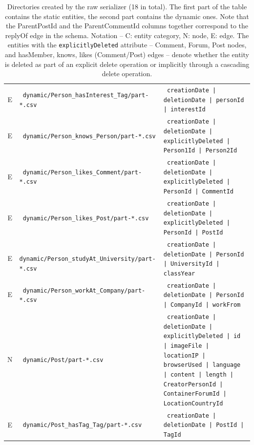 \begin{table}[htb]
\begin{tabularx}{\linewidth}{|>{\sffamily}c|>{\tt}l|>{\tt}X|}
        E                    & dynamic/Person\_hasInterest\_Tag/part-*.csv      & creationDate | deletionDate | personId | interestId \\
        E                    & dynamic/Person\_knows\_Person/part-*.csv         & creationDate | deletionDate | explicitlyDeleted | Person1Id | Person2Id \\
        E                    & dynamic/Person\_likes\_Comment/part-*.csv        & creationDate | deletionDate | explicitlyDeleted | PersonId | CommentId \\
        E                    & dynamic/Person\_likes\_Post/part-*.csv           & creationDate | deletionDate | explicitlyDeleted | PersonId | PostId \\
        E                    & dynamic/Person\_studyAt\_University/part-*.csv   & creationDate | deletionDate | PersonId | UniversityId | classYear \\
        E                    & dynamic/Person\_workAt\_Company/part-*.csv       & creationDate | deletionDate | PersonId | CompanyId | workFrom \\
        \hline
        N                    & dynamic/Post/part-*.csv                          & creationDate | deletionDate | explicitlyDeleted | id | imageFile | locationIP | browserUsed | language | content | length | CreatorPersonId | ContainerForumId | LocationCountryId \\
        E                    & dynamic/Post\_hasTag\_Tag/part-*.csv             & creationDate | deletionDate | PostId | TagId \\
        \hline
    \end{tabularx}
    \caption{Directories created by the raw serializer (18 in total). The first part of the table contains the static entities, the second part contains the dynamic ones.
        Note that the \textsf{ParentPostId} and the \textsf{ParentCommentId} columns together correspond to the \textsf{replyOf} edge in the schema.
        Notation -- \textsf{C}: entity category, \textsf{N}: node, \textsf{E}: edge.
        The entities with the \texttt{explicitlyDeleted} attribute -- Comment, Forum, Post nodes, and hasMember, knows, likes (Comment/Post) edges -- denote whether the entity is deleted as part of an explicit delete operation or implicitly through a cascading delete operation.}
    \label{table:csv-raw}
\end{table}
